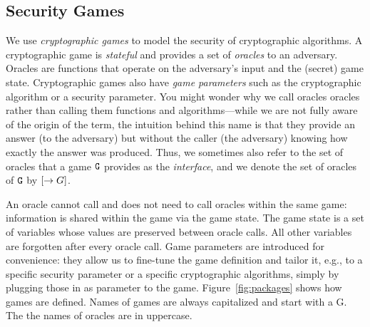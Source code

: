 \subsection{Security Games}\label{ssec:security-games}
We use \emph{cryptographic games} to model the security of cryptographic algorithms.
A cryptographic game is \emph{stateful} and provides a set of \emph{oracles} to an
adversary. Oracles are functions that operate on the adversary's input and the (secret)
game state. Cryptographic games also have \emph{game parameters} such as the
cryptographic algorithm or a security parameter. You might wonder why we call oracles
oracles rather than calling them functions and algorithms---while we are not fully
aware of the origin of the term, the intuition behind this name is that they provide
an answer (to the adversary) but without the caller (the adversary) knowing how
exactly the answer was produced. Thus, we sometimes also refer to the set of oracles that
a game $\text{\texttt{G}}$ provides as the \emph{interface}, and we denote the set of oracles
of $\text{\texttt{G}}$ by $[\rightarrow G]$.

An oracle cannot call and does not need to call oracles within the same game: information is shared within the game via the game state. The game state is a set of variables whose values are preserved between oracle calls. All other variables are forgotten after every oracle call.
Game parameters are introduced for convenience: they allow us to fine-tune the game definition and tailor it, e.g., to a specific security parameter or a specific cryptographic algorithms, simply by plugging those in as parameter to the game. Figure~\ref{fig:packages} shows how games are defined. Names of games are always capitalized and start with a G. The the names of oracles are in uppercase.

